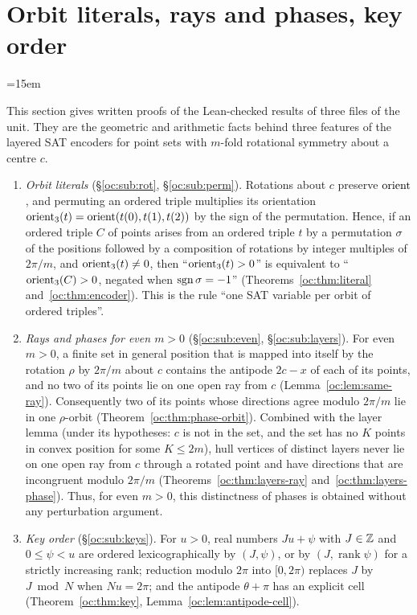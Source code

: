 \section{Orbit literals, rays and phases, key order}\label{oc:sec}
\begingroup\sloppy\emergencystretch=15em

This section gives written proofs of the Lean-checked results of three files of the 
unit. They are the geometric and arithmetic facts behind three features of the layered SAT encoders
for point sets with $m$-fold rotational symmetry about a centre $c$.
\begin{enumerate}[label=(\Alph*)]
\item \emph{Orbit literals} (\S\ref{oc:sub:rot}, \S\ref{oc:sub:perm}). Rotations about $c$ preserve
  $\operatorname{orient}$, and permuting an ordered triple multiplies its orientation
  $\operatorname{orient}_3(t)=\operatorname{orient}(t(0),t(1),t(2))$ by the sign of the permutation. Hence, if an ordered triple
  $C$ of points arises from an ordered triple $t$ by a permutation $\sigma$ of the positions followed by
  a composition of rotations by integer multiples of $2\pi/m$, and $\operatorname{orient}_3(t)\ne0$, then
  ``$\operatorname{orient}_3(t)>0$'' is equivalent to ``$\operatorname{orient}_3(C)>0$, negated when $\operatorname{sgn}\sigma=-1$''
  (Theorems~\ref{oc:thm:literal} and~\ref{oc:thm:encoder}). This is the rule ``one SAT variable per
  orbit of ordered triples''.
\item \emph{Rays and phases for even $m>0$} (\S\ref{oc:sub:even}, \S\ref{oc:sub:layers}). For even
  $m>0$, a finite set in general position that is mapped into itself by the rotation $\rho$ by $2\pi/m$
  about $c$ contains the antipode $2c-x$ of each of its points, and no two of its points lie on one open
  ray from $c$ (Lemma~\ref{oc:lem:same-ray}). Consequently two of its points whose directions agree
  modulo $2\pi/m$ lie in one $\rho$-orbit (Theorem~\ref{oc:thm:phase-orbit}). Combined with the layer
  lemma (under its hypotheses: $c$ is not in the set, and the set has no $K$ points in convex position
  for some $K\le2m$), hull vertices of distinct layers never lie on one open ray from $c$ through a
  rotated point and have directions that are incongruent modulo $2\pi/m$
  (Theorems~\ref{oc:thm:layers-ray} and~\ref{oc:thm:layers-phase}). Thus, for even $m>0$, this
  distinctness of phases is obtained without any perturbation argument.
\item \emph{Key order} (\S\ref{oc:sub:keys}). For $u>0$, real numbers $Ju+\psi$ with $J\in\mathbb Z$ and
  $0\le\psi<u$ are ordered lexicographically by $(J,\psi)$, or by $(J,\operatorname{rank}\psi)$ for a
  strictly increasing rank; reduction modulo $2\pi$ into $[0,2\pi)$ replaces $J$ by $J\bmod N$ when
  $Nu=2\pi$; and the antipode $\theta+\pi$ has an explicit cell (Theorem~\ref{oc:thm:key},
  Lemma~\ref{oc:lem:antipode-cell}).
\end{enumerate}

